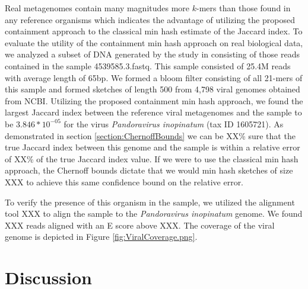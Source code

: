 \documentclass[11pt]{amsart}
\theoremstyle{remark}
\numberwithin{equation}{section}
\begin{document}
Real metagenomes contain many magnitudes more $k$-mers than those found in any reference organisms \cite{} which indicates the advantage of utilizing the proposed containment approach to the classical min hash estimate of the Jaccard index. To evaluate the utility of the containment min hash approach on real biological data, we analyzed a subset of DNA generated by the study in \cite{howe2014tackling} consisting of those reads contained in the sample 4539585.3.fastq. This sample consisted of 25.4M reads with average length of 65bp. We formed a bloom filter consisting of all 21-mers of this sample and formed sketches of length 500 from 4,798 viral genomes obtained from NCBI. Utilizing the proposed containment min hash approach, we found the largest Jaccard index between the reference viral metagenomes and the sample to be $3.846*10^{-05}$ for the virus 
\textit{Pandoravirus inopinatum} (tax ID 1605721). As demonstrated in section \ref{section:ChernoffBounds} we can be XX\% sure that the true Jaccard index between this genome and the sample is within a relative error of XX\% of the true Jaccard index value.  If we were to use the classical min hash approach, the Chernoff bounds dictate that we would min hash sketches of size XXX to achieve this same confidence bound on the relative error.

To verify the presence of this organism in the sample, we utilized the alignment tool XXX to align the sample to the \textit{Pandoravirus inopinatum} genome. We found XXX reads aligned with an E score above XXX. The coverage of the viral genome is depicted in Figure \ref{fig:ViralCoverage.png}.

\section{Discussion}


\clearpage
{}

\end{document}

